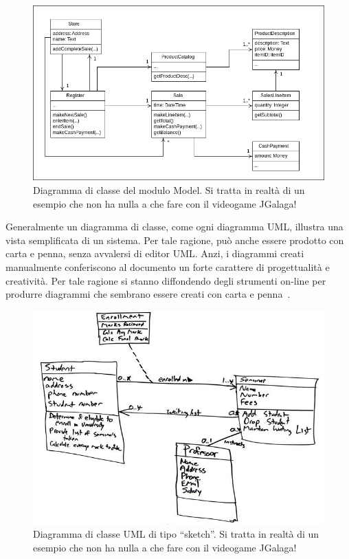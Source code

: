\documentclass[12pt,a4paper]{report}
\begin{document}
\begin{figure}[tb]
  \includegraphics[width=\linewidth]{ModelClassDiagram}
  \caption{Diagramma di classe del modulo Model. Si tratta in realt\`a di un esempio che non ha nulla a che fare con il videogame JGalaga!}
  \label{fig:model}
\end{figure}

\lipsum[13-15]
\medskip

Generalmente un diagramma di classe, come ogni diagramma UML, illustra una vista semplificata di un sistema. Per tale ragione, pu\`o anche essere prodotto con carta e penna, senza avvalersi di editor UML. Anzi, i diagrammi creati manualmente conferiscono al documento un forte carattere di progettualit\`a e creativit\`a. Per tale ragione si stanno diffondendo degli strumenti on-line per produrre diagrammi che sembrano essere creati con carta e penna~\cite{yUML}.

\begin{figure}[tb]
  \includegraphics[width=\linewidth]{classDiagramSketch}
  \caption{Diagramma di classe UML di tipo ``sketch''. Si tratta in realt\`a di un esempio che non ha nulla a che fare con il videogame JGalaga!}
  \label{fig:model-sketch}
\end{figure}
\end{document}
